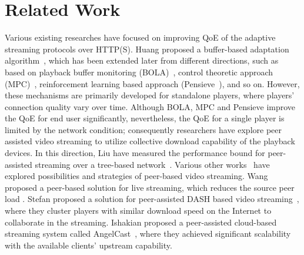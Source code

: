 \section{Related Work}
Various existing researches have focused on improving QoE of the adaptive streaming protocols over HTTP(S). Huang \etal proposed a buffer-based adaptation algorithm~\cite{buffer-based-sigcomm-2014}, which has been extended later from different directions, such as based on playback buffer monitoring (BOLA)~\cite{bola2-acm-mmsys2018}, control theoretic approach (MPC)~\cite{MPC-SIGCOMM-2015}, reinforcement learning based approach (Pensieve~\cite{Pensieve}), and so on. However, these mechanisms are primarily developed for standalone players, where players' connection quality vary over time. Although BOLA, MPC and Pensieve improve the QoE for end user significantly, nevertheless, the QoE for a single player is limited by the network condition; consequently researchers have explore peer assisted video streaming to utilize collective download capability of the playback devices. In this direction, 
Liu \etal have measured the performance bound for peer-assisted streaming over a tree-based network~\cite{Liu-sigmetrics-2008}. 
Various other works~\cite{Wang:ACMmm-2011,TNET-Coop-2015,EdgeNode-GameTheory-Globecomm-2018, Collaborative-P2P-WCNC-2018} have explored possibilities and strategies of peer-based video streaming. Wang \etal proposed a peer-based solution for live streaming, which reduces the source peer load \cite{Wang:ACMmm-2011}. Stefan \etal proposed a solution for peer-assisted DASH based video streaming~\cite{P2PHttp-2012}, where they cluster players with similar download speed on the Internet to collaborate in the streaming. 
Ishakian \etal proposed a peer-assisted cloud-based streaming system called AngelCast~\cite{ISHAKIAN201714}, where they achieved significant scalability with the available clients' upstream capability.
